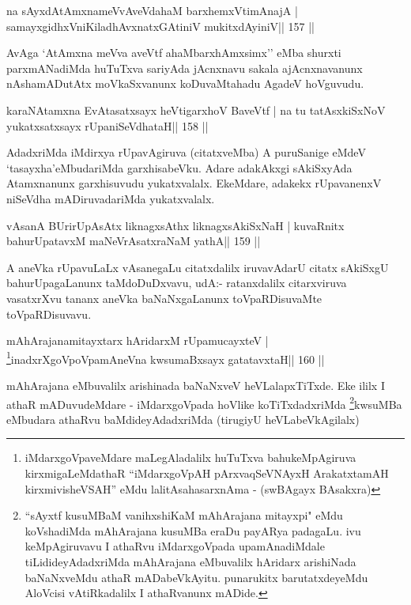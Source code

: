 \begin{shl}
na sAyxdAtAmxnameVvAveVdahaM barxhemxVtimAnajA |
samayxgidhxVniKiladhAvxnatxGAtiniV mukitxdAyiniV\hfill || 157 ||
\end{shl}

\begin{artha}
AvAga `AtAmxna meVva aveVtf ahaMbarxhAmxsimx'' eMba shurxti parxmANadiMda huTuTxva sariyAda jAcnxnavu sakala ajAcnxnavanunx nAshamADutAtx moVkaSxvanunx koDuvaMtahadu AgadeV hoVguvudu.
\end{artha}

\begin{shl}
karaNAtamxna EvAtasatxsayx heVtigarxhoV BaveVtf |
na tu tatAsxkiSxNoV yukatxsatxsayx rUpaniSeVdhataH\hfill || 158 ||
\end{shl}

\begin{artha}
AdadxriMda iMdirxya rUpavAgiruva (citatxveMba) A puruSanige eMdeV `tasayxha'eMbudariMda garxhisabeVku. Adare adakAkxgi sAkiSxyAda Atamxnanunx garxhisuvudu yukatxvalalx. EkeMdare, adakekx rUpavanenxV niSeVdha mADiruvadariMda yukatxvalalx.
\end{artha}


\begin{shl}
vAsanA BUrirUpAsAtx liknagxsAthx liknagxsAkiSxNaH |
kuvaRnitx bahurUpatavxM maNeVrAsatxraNaM yathA\hfill || 159 ||
\end{shl}

\begin{artha}
A aneVka rUpavuLaLx vAsanegaLu citatxdalilx iruvavAdarU citatx sAkiSxgU bahurUpagaLanunx taMdoDuDxvavu, udA:- ratanxdalilx citarxviruva vasatxrXvu tananx aneVka baNaNxgaLanunx toVpaRDisuvaMte toVpaRDisuvavu.
\end{artha}

\begin{shl}
mAhArajanamitayxtarx hAridarxM rUpamucayxteV |
\footnote{iMdarxgoVpaveMdare maLegAladalilx huTuTxva bahukeMpAgiruva kirxmigaLeMdathaR ``iMdarxgoVpAH pArxvaqSeVNAyxH ArakatxtamAH kirxmivisheVSAH'' eMdu lalitAsahasarxnAma - (swBAgayx BAsakxra)}inadxrXgoVpoVpamAneVna kwsumaBxsayx gatatavxtaH\hfill || 160 ||
\end{shl}

\begin{artha}
mAhArajana eMbuvalilx arishinada baNaNxveV heVLalapxTiTxde. Eke ililx
I athaR mADuvudeMdare - iMdarxgoVpada hoVlike
koTiTxdadxriMda \footnote{``sAyxtf kusuMBaM vanihxshiKaM mAhArajana
mitayxpi" eMdu koVshadiMda mAhArajana kusuMBa eraDu payARya
padagaLu. ivu keMpAgiruvavu I athaRvu iMdarxgoVpada upamAnadiMdale
tiLidideyAdadxriMda mAhArajana eMbuvalilx hAridarx arishiNada
baNaNxveMdu athaR mADabeVkAyitu. punarukitx barutatxdeyeMdu AloVcisi
vAtiRkadalilx I athaRvanunx mADide.}kwsuMBa eMbudara athaRvu
baMdideyAdadxriMda (tirugiyU heVLabeVkAgilalx)
\end{artha}

